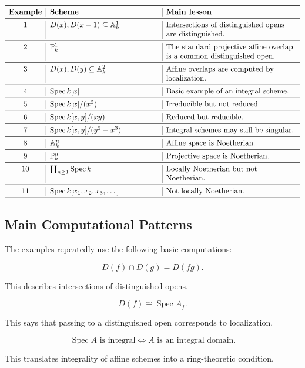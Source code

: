\documentclass[12pt,a4paper]{article}
\DeclareMathOperator{\Spec}{Spec}
\providecommand{\Spec}{\operatorname{Spec}}
\providecommand{\A}{\mathbb A}
\theoremstyle{notespace}
\begin{document}
\[
\begin{array}{c|>{\raggedright\arraybackslash}p{5cm}|>{\raggedright\arraybackslash}p{6cm}}
	\toprule
	\textbf{Example} & \textbf{Scheme} & \textbf{Main lesson} \\
	\midrule
	1
	&
	\(D(x),D(x-1)\subseteq \A^1_k\)
	&
	Intersections of distinguished opens are distinguished.
	\\
	\midrule
	2
	&
	\(\mathbb P^1_k\)
	&
	The standard projective affine overlap is a common distinguished open.
	\\
	\midrule
	3
	&
	\(D(x),D(y)\subseteq \A^2_k\)
	&
	Affine overlaps are computed by localization.
	\\
	\midrule
	4
	&
	\(\Spec k[x]\)
	&
	Basic example of an integral scheme.
	\\
	\midrule
	5
	&
	\(\Spec k[x]/(x^2)\)
	&
	Irreducible but not reduced.
	\\
	\midrule
	6
	&
	\(\Spec k[x,y]/(xy)\)
	&
	Reduced but reducible.
	\\
	\midrule
	7
	&
	\(\Spec k[x,y]/(y^2-x^3)\)
	&
	Integral schemes may still be singular.
	\\
	\midrule
	8
	&
	\(\A^n_k\)
	&
	Affine space is Noetherian.
	\\
	\midrule
	9
	&
	\(\mathbb P^n_k\)
	&
	Projective space is Noetherian.
	\\
	\midrule
	10
	&
	\(\coprod_{n\geq 1}\Spec k\)
	&
	Locally Noetherian but not Noetherian.
	\\
	\midrule
	11
	&
	\(\Spec k[x_1,x_2,x_3,\dots]\)
	&
	Not locally Noetherian.
	\\
	\bottomrule
\end{array}
\]

\subsection{Main Computational Patterns}

The examples repeatedly use the following basic computations:

\[
D(f)\cap D(g)=D(fg).
\]

This describes intersections of distinguished opens.

\[
D(f)\cong \Spec A_f.
\]

This says that passing to a distinguished open corresponds to localization.

\[
\Spec A\text{ is integral}
\iff
A\text{ is an integral domain}.
\]

This translates integrality of affine schemes into a ring-theoretic condition.
\end{document}
